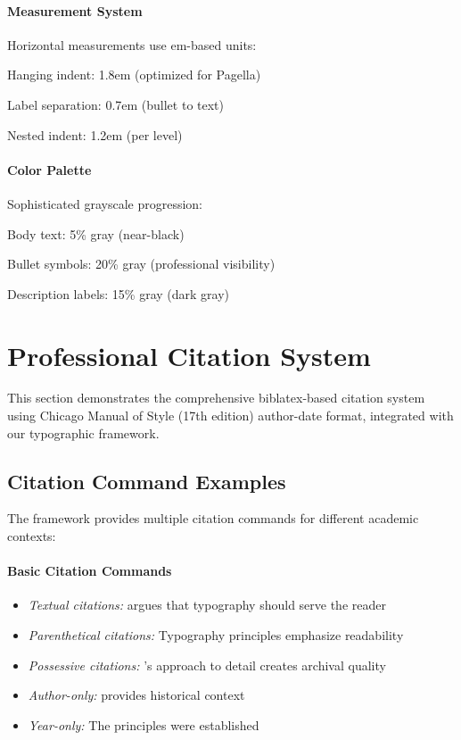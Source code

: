 \documentclass[11pt]{article}
\begin{document}
\paragraph{Measurement System} Horizontal measurements use em-based units:
\begin{compactitem}
\item Hanging indent: 1.8em (optimized for Pagella)
\item Label separation: 0.7em (bullet to text)
\item Nested indent: 1.2em (per level)
\end{compactitem}

\paragraph{Color Palette} Sophisticated grayscale progression:
\begin{compactitem}
\item Body text: 5\% gray (near-black)
\item Bullet symbols: 20\% gray (professional visibility)
\item Description labels: 15\% gray (dark gray)
\end{compactitem}

\clearpage

\section{Professional Citation System}

This section demonstrates the comprehensive biblatex-based citation system using Chicago Manual of Style (17th edition) author-date format, integrated with our typographic framework.

\subsection{Citation Command Examples}

The framework provides multiple citation commands for different academic contexts:

\paragraph{Basic Citation Commands}
\begin{itemize}
\item \emph{Textual citations:} \textcite{butterick2019practical} argues that typography should serve the reader
\item \emph{Parenthetical citations:} Typography principles emphasize readability \parencite{brown2018flexible}
\item \emph{Possessive citations:} \citeauthor{hochuli1987detail}'s approach to detail creates archival quality
\item \emph{Author-only:} \textcite{bringhurst2012elements} provides historical context
\item \emph{Year-only:} The principles were established \parencite*{hochuli1987detail}
\end{itemize}
\end{document}
